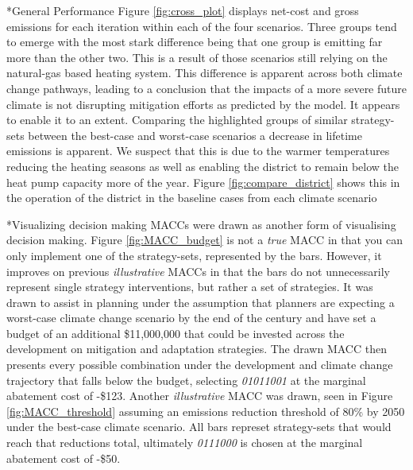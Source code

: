 \documentclass[twocolumn, a4paper,10pt]{article}
\makeatletter
\renewcommand\subsection{\@startsection{subsection}{1}{\z@}{\z@}{\z@}{\normalfont\normalsize\bfseries}}
\renewcommand\subsection{\@startsection{subsection}{1}{\z@}{\z@}{0.1pt}{\normalfont\normalsize\bfseries}}
\makeatother
\begin{document}
\subsection*{General Performance}
Figure \ref{fig:cross_plot} displays net-cost and gross emissions for each iteration within each of the four scenarios. Three groups tend to emerge with the most stark difference being that one group is emitting far more than the other two. This is a result of those scenarios still relying on the natural-gas based heating system. This difference is apparent across both climate change pathways, leading to a conclusion that the impacts of a more severe future climate is not disrupting mitigation efforts as predicted by the model. It appears to enable it to an extent. Comparing the highlighted groups of similar strategy-sets between the best-case and worst-case scenarios a decrease in lifetime emissions is apparent. We suspect that this is due to the warmer temperatures reducing the heating seasons as well as enabling the district to remain below the heat pump capacity more of the year. Figure \ref{fig:compare_district} shows this in the operation of the district in the baseline cases from each climate scenario

\subsection*{Visualizing decision making}
MACCs were drawn as another form of visualising decision making. Figure \ref{fig:MACC_budget} is not a \textit{true} MACC in that you can only implement one of the strategy-sets, represented by the bars. However, it improves on previous \textit{illustrative} MACCs in that the bars do not unnecessarily represent single strategy interventions, but rather a set of strategies. It was drawn to assist in planning under the assumption that planners are expecting a worst-case climate change scenario by the end of the century and have set a budget of an additional \$11,000,000 that could be invested across the development on mitigation and adaptation strategies. The drawn MACC then presents every possible combination under the development and climate change trajectory that falls below the budget, selecting \textit{01011001} at the marginal abatement cost of -\$123. Another \textit{illustrative} MACC was drawn, seen in Figure \ref{fig:MACC_threshold} assuming an emissions reduction threshold of 80\% by 2050 under the best-case climate scenario. All bars represet strategy-sets that would reach that reductions total, ultimately \textit{0111000} is chosen at the marginal abatement cost of -\$50.
\end{document}
